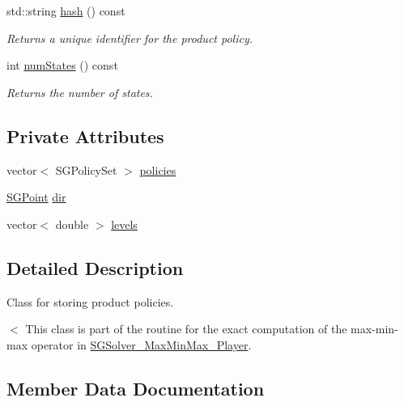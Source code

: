 \begin{DoxyCompactItemize}
\mbox{\label{classSGProductPolicy_a8749ddaea74aa5174bcb21971020e097}} 
std\+::string \hyperlink{classSGProductPolicy_a8749ddaea74aa5174bcb21971020e097}{hash} () const
\begin{DoxyCompactList}\small\item\em Returns a unique identifier for the product policy. \end{DoxyCompactList}\item 
\mbox{\label{classSGProductPolicy_aa409d0511c127e2624f143ffbae0145c}} 
int \hyperlink{classSGProductPolicy_aa409d0511c127e2624f143ffbae0145c}{num\+States} () const
\begin{DoxyCompactList}\small\item\em Returns the number of states. \end{DoxyCompactList}\end{DoxyCompactItemize}
\subsection*{Private Attributes}
\begin{DoxyCompactItemize}
\item 
vector$<$ S\+G\+Policy\+Set $>$ \hyperlink{classSGProductPolicy_abdf942313081ac619e2a2efe7bf1480d}{policies}
\item 
\hyperlink{classSGPoint}{S\+G\+Point} \hyperlink{classSGProductPolicy_ac8fcfe1943a80e7229f4499f3ada1026}{dir}
\item 
vector$<$ double $>$ \hyperlink{classSGProductPolicy_a2bc6dc794b3e3e74e6a84a9d4d3f47ec}{levels}
\end{DoxyCompactItemize}


\subsection{Detailed Description}
Class for storing product policies. 

$<$ This class is part of the routine for the exact computation of the max-\/min-\/max operator in \hyperlink{classSGSolver__MaxMinMax__3Player}{S\+G\+Solver\+\_\+\+Max\+Min\+Max\+\_\+Player}. 

\subsection{Member Data Documentation}
\mbox{\label{classSGProductPolicy_ac8fcfe1943a80e7229f4499f3ada1026}} 
